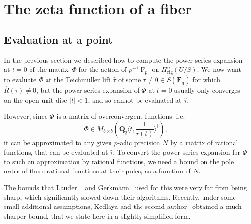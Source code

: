 \documentclass[a4paper,11pt]{article}
\numberwithin{equation}{section}
\newcommand{\QQ}{\mathbf{Q}} %
\newcommand{\FF}{\mathbf{F}} %
\DeclareMathOperator{\Frob}{F}           %
\providecommand{\Hrig}{H_{\text{rig}}}  %
\theoremstyle{definition}
\begin{document}

\section{The zeta function of a fiber}

\subsection{Evaluation at a point}
\label{sec:Evaluation}

In the previous section we described how to compute the power series expansion at $t=0$ of
the matrix~$\Phi$ for the action of $p^{-1} \Frob_p$ on $\Hrig^{n}(U/S)$. We now want to
evaluate $\Phi$ at the Teichm\"uller lift $\hat{\tau}$ of some $\tau \neq 0 \in S(\FF_{\mathfrak{q}})$
for which $\overline{R}(\tau) \neq 0$,
but the power series expansion of $\Phi$ at $t=0$ usually only converges on the open 
unit disc $|t|<1$, and so cannot be evaluated at $\hat{\tau}$. 

However, since $\Phi$ is a matrix of overconvergent functions, i.e.\ 
\[
\Phi \in M_{b \times b}(\QQ_q \langle t,\frac{1}{r(t)} \rangle^{\dag}),
\]
it can be approximated to any given $p$-adic precision $N$ by a matrix of rational 
functions, that can be evaluated at $\hat{\tau}$. To convert the power series expansion
for $\Phi$ to such an approximation by rational functions, we need a bound on the pole order
of these rational functions at their poles, as a function of $N$. 

The bounds that
Lauder ~\citep[\S 8.1]{Lauder2004a} and Gerkmann~\citep[\S 6]{Gerkmann2007} used for this
were very far from being sharp, which significantly slowed down their algorithms.
Recently, under some small additional assumptions, Kedlaya and the second 
author~\citep[Theorem~2.1]{KedlayaTuitman2012} obtained a much sharper bound,
that we state here in a slightly simplified form.
\end{document}
